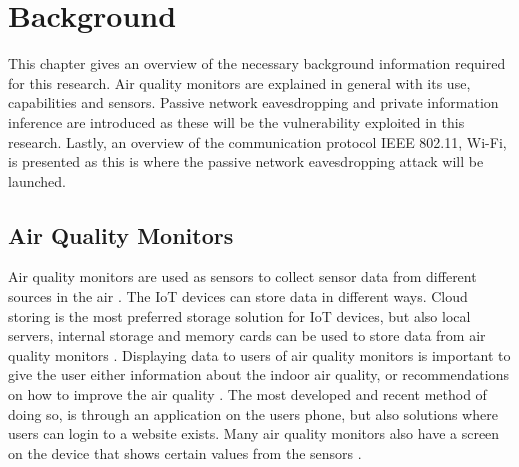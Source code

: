 \chapter{Background}
This chapter gives an overview of the necessary background information required for this research. Air quality monitors are explained in general with its use, capabilities and sensors. Passive network eavesdropping and private information inference are introduced as these will be the vulnerability exploited in this research. Lastly, an overview of the communication protocol IEEE 802.11, \gls{Wi-Fi}, is presented as this is where the passive network eavesdropping attack will be launched. 

\section{Air Quality Monitors}
Air quality monitors are used as sensors to collect sensor data from different sources in the air \cite{GeneralAirQualityMonitor}. The \gls{IoT} devices can store data in different ways. Cloud storing is the most preferred storage solution for \gls{IoT} devices, but also local servers, internal storage and memory cards can be used to store data from air quality monitors \cite{AQMBigSource}. Displaying data to users of air quality monitors is important to give the user either information about the indoor air quality, or recommendations on how to improve the air quality \cite{AQMBigSource}. The most developed and recent method of doing so, is through an application on the users phone, but also solutions where users can login to a website exists. Many air quality monitors also have a screen on the device that shows certain values from the sensors \cite{AQMBigSource}.

